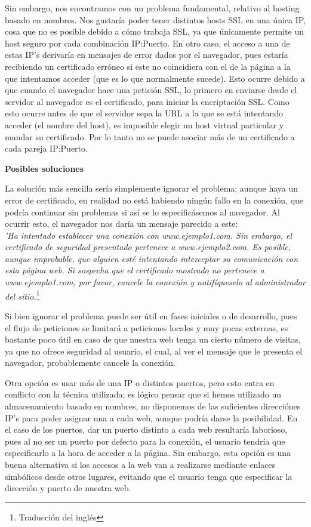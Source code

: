 \documentclass[a4paper, 10pt]{article} %
\begin{document}
Sin embargo, nos encontramos con un problema fundamental, relativo al hosting basado en nombres. Nos gustaría poder tener distintos hosts SSL en una única IP, cosa que no es posible debido a cómo trabaja SSL, ya que únicamente permite un host seguro por cada combinación IP:Puerto. En otro caso, el acceso a una de estas IP's derivaría en mensajes de error dados por el navegador, pues estaría recibiendo un certificado erróneo si este no coincidiera con el de la página a la que intentamos acceder (que es lo que normalmente sucede). Esto ocurre debido a que cuando el navegador hace una petición SSL, lo primero en enviarse desde el servidor al navegador es el certificado, para iniciar la encriptación SSL. Como esto ocurre antes de que el servidor sepa la URL a la que se está intentando acceder (el nombre del host), es imposible elegir un host virtual particular y mandar su certificado. Por lo tanto no se puede asociar más de un certificado a cada pareja IP:Puerto. 

\textbf{Posibles soluciones}

La solución más sencilla sería simplemente ignorar el problema; aunque haya un error de certificado, en realidad no está habiendo ningún fallo en la conexión, que podría continuar sin problemas si así se lo especificásemos al navegador. Al ocurrir esto, el navegador nos daría un mensaje parecido a este: \\
\textit{'Ha intentado establecer una conexión con www.ejemplo1.com. Sin embargo, el certificado de seguridad presentado pertenece a www.ejemplo2.com. Es posible, aunque improbable, que alguien esté intentando interceptar su comunicación con esta página web. Si sospecha que el certificado mostrado no pertenece a www.ejemplo1.com, por favor, cancele la conexión y notifíqueselo al administrador del sitio.}\footnote{Traducción del inglés} 

Si bien ignorar el problema puede ser útil en fases iniciales o de desarrollo, pues el flujo de peticiones se limitará a peticiones locales y muy pocas externas, es bastante poco útil en caso de que nuestra web tenga un cierto número de visitas, ya que no ofrece seguridad al usuario, el cual, al ver el mensaje que le presenta el navegador, probablemente cancele la conexión. 

Otra opción es usar más de una IP o distintos puertos, pero esto entra en conflicto con la técnica utilizada; es lógico pensar que si hemos utilizado un almacenamiento basado en nombres, no disponemos de las suficientes direcciónes IP's para poder asignar una a cada web, aunque podría darse la posibilidad. En el caso de los puertos, dar un puerto distinto a cada web resultaría laborioso, pues al no ser un puerto por defecto para la conexión, el usuario tendría que especificarlo a la hora de acceder a la página. Sin embargo, esta opción es una buena alternativa si los accesos a la web van a realizarse mediante enlaces simbólicos desde otros lugares, evitando que el usuario tenga que especificar la dirección y puerto de nuestra web.
\end{document}
